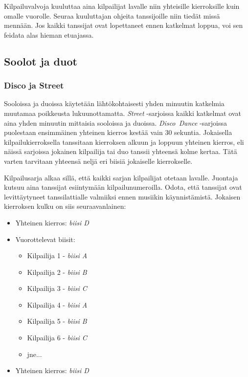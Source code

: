 \documentclass[12pt, a4paper, oneside]{article}
\begin{document}
Kilpailuvalvoja kuuluttaa aina kilpailijat lavalle niin yhteisille kierroksille kuin omalle vuorolle.
Seuraa kuuluttajan ohjeita tanssijoille niin tiedät missä mennään.
Jos kaikki tanssijat ovat lopettaneet ennen katkelmat loppua,
voi sen feidata alas hieman etuajassa.

\subsection{Soolot ja duot}

\subsubsection{Disco ja Street}

Sooloissa ja duoissa käytetään lähtökohtaisesti yhden minuutin katkelmia muutamaa poikkeusta lukuunottamatta.
\textit{Street} -sarjoissa kaikki katkelmat ovat aina yhden minuutin mittaisia sooloissa ja duoissa.
\textit{Disco~Dance} -sarjoissa puolestaan ensimmäinen yhteinen kierros kestää vain 30 sekuntia.
Jokaisella kilpailukierroksella tanssitaan kierroksen alkuun ja loppuun yhteinen kierros,
eli näissä sarjoissa jokainen kilpailija tai duo tanssii yhteensä kolme kertaa.
Tätä varten tarvitaan yhteensä neljä eri biisiä jokaiselle kierrokselle.

Kilpailusarja alkaa sillä,
että kaikki sarjan kilpailijat otetaan lavalle.
Juontaja kutsuu aina tanssijat esiintymään kilpailunumeroilla.
Odota, että tanssijat ovat levittäytyneet tanssilattialle valmiiksi ennen musiikin käynnistämistä.
Jokaisen kierroksen kulku on siis seuraavanlainen:

\begin{itemize}[nosep]
    \item Yhteinen kierros: \textit{biisi D}
    \item Vuorottelevat biisit:
          \begin{itemize}
              \item Kilpailija 1 - \textit{biisi A}
              \item Kilpailija 2 - \textit{biisi B}
              \item Kilpailija 3 - \textit{biisi C}
              \item Kilpailija 4 - \textit{biisi A}
              \item Kilpailija 5 - \textit{biisi B}
              \item Kilpailija 6 - \textit{biisi C}
              \item jne...
          \end{itemize}
    \item Yhteinen kierros: \textit{biisi D}
\end{itemize}
\end{document}
